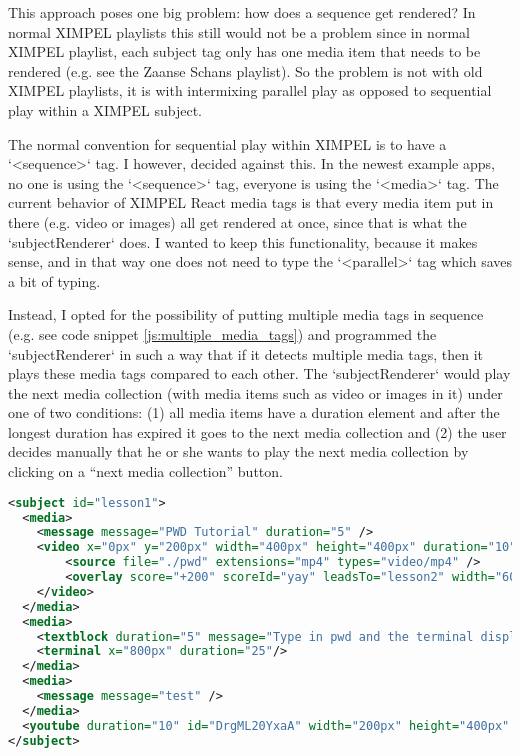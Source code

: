 This approach poses one big problem: how does a sequence get rendered? In normal XIMPEL playlists this still would not be a problem since in normal XIMPEL playlist, each subject tag only has one media item that needs to be rendered (e.g. see the Zaanse Schans playlist). So the problem is not with old XIMPEL playlists, it is with intermixing parallel play as opposed to sequential play within a XIMPEL subject.

The normal convention for sequential play within XIMPEL is to have a `<sequence>` tag. I however, decided against this. In the newest example apps, no one is using the `<sequence>` tag, everyone is using the `<media>` tag. The current behavior of XIMPEL React media tags is that every media item put in there (e.g. video or images) all get rendered at once, since that is what the `subjectRenderer` does. I wanted to keep this functionality, because it makes sense, and in that way one does not need to type the `<parallel>` tag which saves a bit of typing.

Instead, I opted for the possibility of putting multiple media tags in sequence (e.g. see code snippet \ref{js:multiple_media_tags}) and programmed the `subjectRenderer` in such a way that if it detects multiple media tags, then it plays these media tags compared to each other. The `subjectRenderer` would play the next media collection (with media items such as video or images in it) under one of two conditions: (1) all media items have a duration element and after the longest duration has expired it goes to the next media collection and (2) the user decides manually that he or she wants to play the next media collection by clicking on a ``next media collection'' button.

\begin{lstlisting}[language=XML, caption=caption is in the comments \textbf{to do}, label=js:multiple_media_tags]
<subject id="lesson1">
  <media>
    <message message="PWD Tutorial" duration="5" />
    <video x="0px" y="200px" width="400px" height="400px" duration="10">
        <source file="./pwd" extensions="mp4" types="video/mp4" />
        <overlay score="+200" scoreId="yay" leadsTo="lesson2" width="600px" height="75px" x="500px" y="500px" message="next lesson"/>
    </video>
  </media>
  <media>
    <textblock duration="5" message="Type in pwd and the terminal displays which directory you are working in." width="600px" height="800px" x="0px" y="100px" color="#0f0" fontsize='50px' fontcolor="#fff"/>
    <terminal x="800px" duration="25"/>    
  </media>
  <media>
    <message message="test" />
  </media>
  <youtube duration="10" id="DrgML20YxaA" width="200px" height="400px" x="1100px" y="200px" stopAtSubjectId="lesson3"/>
</subject>
\end{lstlisting}

